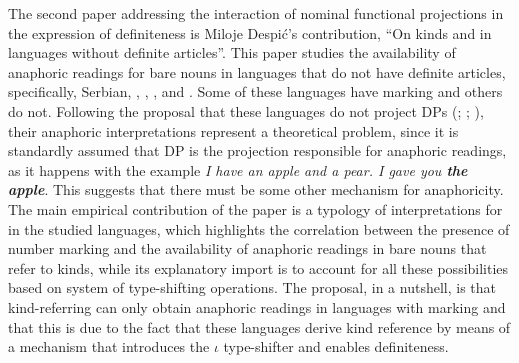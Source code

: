 \documentclass[output=paper]{langsci/langscibook}
\begin{document}
The second paper addressing the interaction of nominal functional projections in the expression of definiteness is Miloje Despić’s contribution, “On kinds and  in languages without definite articles”. This paper studies the availability of anaphoric readings for bare nouns in languages that do not have definite articles, specifically, Serbian, , , , and . Some of these languages have  marking and others do not. Following the proposal that these languages do not project DPs (\citealt{Baker2003}; \citealt{Boskovic2008,BoskovicGajewski2011}; \citealt{Despic2011,Despic2013,Despic2015}), their anaphoric interpretations represent a theoretical problem, since it is standardly assumed that DP is the projection responsible for anaphoric readings, as it happens with the  example \textit{I have an apple and a pear. I gave you \textbf{the apple}}. This suggests that there must be some other mechanism for anaphoricity. The main empirical contribution of the paper is a typology of interpretations for  in the studied languages, which highlights the correlation between the presence of number marking and the availability of anaphoric readings in bare nouns that refer to kinds, while its explanatory import is to account for all these possibilities based on  system of type-shifting operations. The proposal, in a nutshell, is that kind-referring  can only obtain anaphoric readings in languages with  marking and that this is due to the fact that these languages derive kind reference by means of a mechanism that introduces the $\iota$ type-shifter and enables definiteness.
\end{document}
